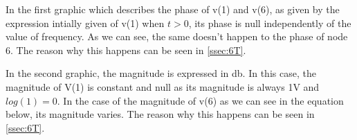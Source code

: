 \par In the first graphic which describes the phase of v(1) and v(6), as given by the expression intially given of v(1) when $t>0$, its phase is null independently of the value of frequency.  As we can see, the same doesn't happen to the phase of node 6. The reason why this happens can be seen in \ref{ssec:6T}.

\par In the second graphic, the magnitude is expressed in db. In this case, the magnitude of V(1) is constant and null as its magnitude is always 1V and $log(1)=0$. In the case of the magnitude of v(6) as we can see in the equation below, its magnitude varies. The reason why this happens can be seen in \ref{ssec:6T}. 


 
